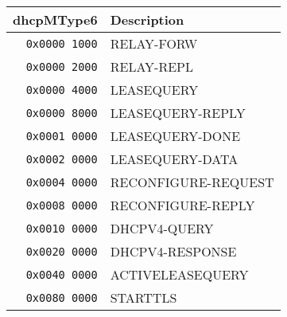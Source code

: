 \documentclass[documentation]{subfiles}
\begin{document}
\begin{minipage}{0.48\textwidth}
    \begin{longtable}{rl}
        \toprule
        {\bf dhcpMType6} & {\bf Description}\\
        \midrule\endhead%
        {\tt 0x0000 1000} & RELAY-FORW\\
        {\tt 0x0000 2000} & RELAY-REPL\\
        {\tt 0x0000 4000} & LEASEQUERY\\
        {\tt 0x0000 8000} & LEASEQUERY-REPLY\\
        {\tt 0x0001 0000} & LEASEQUERY-DONE\\
        {\tt 0x0002 0000} & LEASEQUERY-DATA\\
        {\tt 0x0004 0000} & RECONFIGURE-REQUEST\\
        {\tt 0x0008 0000} & RECONFIGURE-REPLY\\
        {\tt 0x0010 0000} & DHCPV4-QUERY\\
        {\tt 0x0020 0000} & DHCPV4-RESPONSE\\
        {\tt 0x0040 0000} & ACTIVELEASEQUERY\\
        {\tt 0x0080 0000} & STARTTLS\\
        \bottomrule
    \end{longtable}
\end{minipage}
\end{document}
